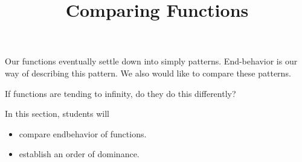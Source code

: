 \documentclass{ximera}
\title{Comparing Functions}
\begin{document}
\begin{abstract}
\end{abstract}
\maketitle







Our functions eventually settle down into simply patterns.  End-behavior is our way of describing this pattern.   We also would like to compare these patterns.


If functions are tending to infinity, do they do this differently?





















\begin{sectionOutcomes}
In this section, students will 

\begin{itemize}
\item compare endbehavior of functions.
\item establish an order of dominance.
\end{itemize}
\end{sectionOutcomes}
\end{document}
